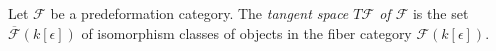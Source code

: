 \begin{definition}
\label{definition-tangent-space}
Let $\mathcal{F}$ be a predeformation category.
The {\it tangent space $T \mathcal{F}$ of $\mathcal{F}$}
is the set $\overline{\mathcal{F}}(k[\epsilon])$
of isomorphism classes of objects in the fiber category $\mathcal
F(k[\epsilon])$.
\end{definition}